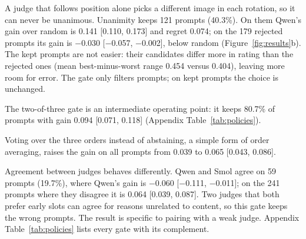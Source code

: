A judge that follows position alone picks a different image in each rotation, so it can never be unanimous. Unanimity keeps 121 prompts (40.3\%). On them Qwen's gain over random is 0.141 [0.110, 0.173] and regret 0.074; on the 179 rejected prompts its gain is $-$0.030 [$-$0.057, $-$0.002], below random (Figure~\ref{fig:results}b). The kept prompts are not easier: their candidates differ more in rating than the rejected ones (mean best-minus-worst range 0.454 versus 0.404), leaving more room for error. The gate only filters prompts; on kept prompts the choice is unchanged.

The two-of-three gate is an intermediate operating point: it keeps 80.7\% of prompts with gain 0.094 [0.071, 0.118] (Appendix Table~\ref{tab:policies}).

Voting over the three orders instead of abstaining, a simple form of order averaging, raises the gain on all prompts from 0.039 to 0.065 [0.043, 0.086].

Agreement between judges behaves differently. Qwen and Smol agree on 59 prompts (19.7\%), where Qwen's gain is $-$0.060 [$-$0.111, $-$0.011]; on the 241 prompts where they disagree it is 0.064 [0.039, 0.087]. Two judges that both prefer early slots can agree for reasons unrelated to content, so this gate keeps the wrong prompts. The result is specific to pairing with a weak judge. Appendix Table~\ref{tab:policies} lists every gate with its complement.
